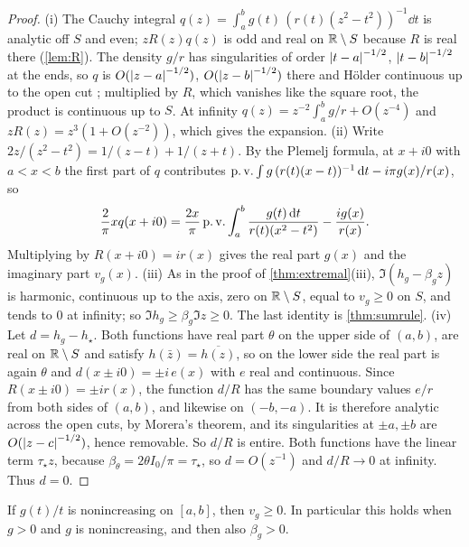 \begin{proof}
(i) The Cauchy integral $q(z)=\int_a^bg(t)\,(r(t)(z^2-t^2))^{-1}\dd t$ is
analytic off $S$ and even; $zR(z)q(z)$ is odd and real on $\mathbb R\setminus S$
because $R$ is real there (\cref{lem:R}). The density $g/r$ has
singularities of order $\left|t-a\right|^{-1/2}$, $\left|t-b\right|^{-1/2}$ at the ends, so
$q$ is $O(\left|z-a\right|^{-1/2})$, $O(\left|z-b\right|^{-1/2})$ there and H\"older
continuous up to the open cut \cite[Ch.~4]{muskhelishvili}; multiplied by
$R$, which vanishes like the square root, the product is continuous up to
$S$. At infinity $q(z)=z^{-2}\int_a^bg/r+O(z^{-4})$ and
$zR(z)=z^3(1+O(z^{-2}))$, which gives the expansion.
(ii) Write $2z/(z^2-t^2)=1/(z-t)+1/(z+t)$. By the Plemelj formula, at
$x+i0$ with $a<x<b$ the first part of $q$ contributes
$\operatorname{p.v.}\int g\,(r(t)(x-t))^{-1}\,\mathrm d t-i\pi g(x)/r(x)$, so
\[
\frac2\pi xq(x+i0)=\frac{2x}\pi\operatorname{p.v.}\int_a^b\frac{g(t)\,\mathrm d t}{r(t)(x^2-t^2)}-\frac{ig(x)}{r(x)} .
\]
Multiplying by $R(x+i0)=ir(x)$ gives the real part $g(x)$ and the imaginary
part $v_g(x)$.
(iii) As in the proof of \cref{thm:extremal}(iii), $\Im(h_g-\beta_gz)$ is
harmonic, continuous up to the axis, zero on $\mathbb R\setminus S$, equal to
$v_g\ge0$ on $S$, and tends to $0$ at infinity; so $\Im h_g\ge\beta_g\Im
z\ge0$. The last identity is \cref{thm:sumrule}.
(iv) Let $d=h_g-h_\star$. Both functions have real part $\theta$ on the upper
side of $(a,b)$, are real on $\mathbb R\setminus S$ and satisfy $h(\bar
z)=\overline{h(z)}$, so on the lower side the real part is again $\theta$ and
$d(x\pm i0)=\pm i\,e(x)$ with $e$ real and continuous. Since $R(x\pm i0)=\pm
ir(x)$, the function $d/R$ has the same boundary values $e/r$ from both
sides of $(a,b)$, and likewise on $(-b,-a)$. It is therefore analytic across
the open cuts, by Morera's theorem, and its singularities at $\pm a,\pm b$
are $O(\left|z-c\right|^{-1/2})$, hence removable. So $d/R$ is entire. Both
functions have the linear term $\tau_\star z$, because
$\beta_\theta=2\theta I_0/\pi=\tau_\star$, so $d=O(z^{-1})$ and $d/R\to0$ at
infinity. Thus $d=0$.
\end{proof}

\begin{lemma}\label{lem:positivity}
If $g(t)/t$ is nonincreasing on $[a,b]$, then $v_g\ge0$. In particular
this holds when $g>0$ and $g$ is nonincreasing, and then also $\beta_g>0$.
\end{lemma}

